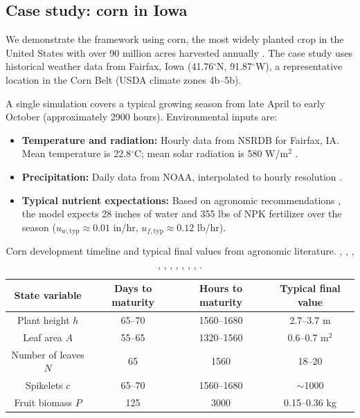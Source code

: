 \documentclass[pdflatex,sn-mathphys-num]{sn-jnl}
\begin{document}
\subsection{Case study: corn in Iowa}\label{subsec:case-study}

We demonstrate the framework using corn, the most widely planted crop in the United States with over 90 million acres harvested annually \cite{fsa-acreage}. The case study uses historical weather data from Fairfax, Iowa (41.76$^{\circ}$N, 91.87$^{\circ}$W), a representative location in the Corn Belt (USDA climate zones 4b--5b).

A single simulation covers a typical growing season from late April to early October (approximately 2900 hours). Environmental inputs are:

\begin{itemize}
\item \textbf{Temperature and radiation:} Hourly data from NSRDB for Fairfax, IA. Mean temperature is 22.8$^{\circ}$C; mean solar radiation is 580 W/m$^{2}$ \cite{NSRDB}.
\item \textbf{Precipitation:} Daily data from NOAA, interpolated to hourly resolution \cite{noaa-precip}.
\item \textbf{Typical nutrient expectations:} Based on agronomic recommendations \cite{corn-nutrient-management}, the model expects 28 inches of water and 355 lbs of NPK fertilizer over the season ($u_{w,\text{typ}} \approx 0.01$ in/hr, $u_{f,\text{typ}} \approx 0.12$ lb/hr).
\end{itemize}

\begin{table}[ht]
\centering
\begin{tabular}{|c|c|c|c|}
\hline
State variable       & Days to maturity & Hours to maturity & Typical final value \\
\hline\hline
Plant height $h$     & 65--70           & 1560--1680        & 2.7--3.7 m          \\
Leaf area $A$        & 55--65           & 1320--1560        & 0.6--0.7 m$^{2}$    \\
Number of leaves $N$ & 65               & 1560              & 18--20              \\
Spikelets $c$        & 65--70           & 1560--1680        & $\sim$1000          \\
Fruit biomass $P$    & 125              & 3000              & 0.15--0.36 kg       \\
\hline
\end{tabular}
\caption{Corn development timeline and typical final values from agronomic literature. \cite{corn-growth-stages,corn-physiology}, \cite{bayer2018height_difference_corn}, \cite{kellersfarmstand2018sweetcorn_fieldcorn_height}, \cite{nanda2017corn_leaf_number_maturity}, \cite{nielsen2025tassel_emergence_pollen_shed}, \cite{ufseeds2024pencil_cob_corn_seed}, \cite{bayer2020corn_growth_stages_gdu}, \cite{ucdavis2024corn_crop_development}, \cite{sisson2020corn_growth_stages}, \cite{westco_corn_growth}, \cite{cornstates2018corn_growth_stages_gdu}.}
\label{tab:corn-development}
\end{table}
\end{document}
